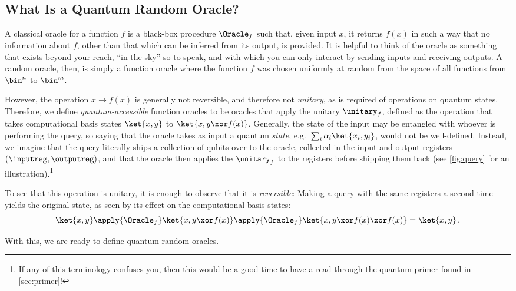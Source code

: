   \subsection{What Is a Quantum Random Oracle?}\label{sec:defs}
    A classical oracle for a function $f$ is a black-box procedure $\Oracle_f$
      such that, given input $x$, it returns $f(x)$ in such a way that no
      information about $f$, other than that which can be inferred from its
      output, is provided. It is helpful to think of the oracle as something that
      exists beyond your reach, ``in the sky'' so to speak, and with which you can
      only interact by sending inputs and receiving outputs.
      A random oracle, then, is simply a function oracle where the
      function $f$ was chosen uniformly at random from the space of all functions
      from $\bin^n$ to $\bin^m$.
  
    However, the operation $x \longrightarrow f(x)$ is generally not reversible,
      and therefore not \emph{unitary}, as is required of operations on quantum
      states. Therefore, we define \emph{quantum-accessible} function oracles to be
      oracles that apply the unitary $\unitary_f$, defined as the operation that
      takes computational basis states $\ket{x, y}$ to $\ket{x, y \xor
      f(x)}$. Generally, the state of the input may be entangled with whoever
      is performing the query, so saying that the oracle takes as input a quantum
      \emph{state}, e.g.\ $\sum_i \alpha_i \ket{x_i, y_i}$, would not be
      well-defined. Instead, we imagine that the query literally ships a
      collection of qubits over to the oracle, collected in the input and output
      registers $(\inputreg, \outputreg)$, and that the oracle then applies the
      $\unitary_f$ to the registers before shipping them back
      (see \cref{fig:query} for an illustration).\footnote{
        If any of this terminology confuses you, then this would be a good time
        to have a read through the quantum primer found in \cref{sec:primer}!
      } 
  
    To see that this operation is unitary, it is enough to observe that it is
      \emph{reversible}: Making a query with the same registers a second time
      yields the original state, as seen by its effect on the computational basis
      states:
      \[ 
        \ket{x, y} \apply{\Oracle_f} \ket{x, y \xor f(x)}
          \apply{\Oracle_f} \ket{x, y \xor f(x) \xor f(x)} = \ket{x, y}\, .
      \]
  
    \noindent
    With this, we are ready to define quantum random oracles.
  
